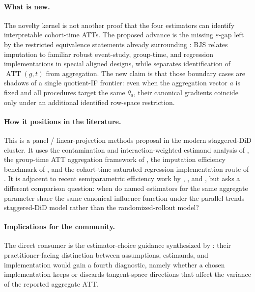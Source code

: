 \documentclass[11pt]{article}
\theoremstyle{definition}
\theoremstyle{plain}
\theoremstyle{remark}
\begin{document}
\paragraph{What is new.}
The novelty kernel is not another proof that the four estimators can identify interpretable
cohort-time ATTs.  The proposed advance is the missing \(\varepsilon\)-gap left by the restricted
equivalence statements already surrounding \citet{BorusyakJaravelSpiess2024}: BJS relates imputation
to familiar robust event-study, group-time, and regression implementations in special aligned designs,
while \citet{CallawaySantAnna2021} separates identification of \(\operatorname{ATT}(g,t)\) from
aggregation.  The new claim is that those boundary cases are shadows of a single quotient-IF
frontier: even when the aggregation vector \(a\) is fixed and all procedures target the same
\(\theta_a\), their canonical gradients coincide only under an additional identified row-space
restriction.

\paragraph{How it positions in the literature.}
This is a panel / linear-projection methods proposal in the modern staggered-DiD cluster.  It uses the
contamination and interaction-weighted estimand analysis of \citet{SunAbraham2021}, the group-time
ATT aggregation framework of \citet{CallawaySantAnna2021}, the imputation efficiency benchmark of
\citet{BorusyakJaravelSpiess2024}, and the cohort-time saturated regression implementation route of
\citet{Wooldridge2021}.  It is adjacent to recent semiparametric efficiency work by
\citet{SantAnnaZhao2020}, \citet{RothSantAnna2021Efficient}, and
\citet{ChenSantAnnaXie2025}, but asks a different comparison question: when do named estimators
for the same aggregate parameter share the same canonical influence function under the parallel-trends
staggered-DiD model rather than the randomized-rollout model?

\paragraph{Implications for the community.}
The direct consumer is the estimator-choice guidance synthesized by
\citet{RothSantAnnaBilinskiPoe2023}: their practitioner-facing distinction between assumptions,
estimands, and implementation would gain a fourth diagnostic, namely whether a chosen implementation
keeps or discards tangent-space directions that affect the variance of the reported aggregate ATT.
\end{document}
